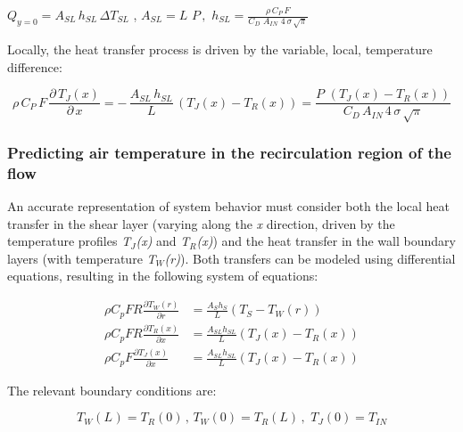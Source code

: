 {\({Q_{y = 0}} = {A_{SL}}\,{h_{SL}}\,\Delta {T_{SL}}\) , \({A_{SL}} = L\,\,P\,,\,\,{h_{SL}} = \frac{{\rho \,{C_P}\,F}}{{{C_D}\,\,{A_{IN}}\,\,4\,\sigma \,\sqrt \pi }}\)

Locally, the heat transfer process is driven by the variable, local, temperature difference:

\begin{equation}
\rho \,{C_P}\,F\,\frac{{\partial \,{T_J}(x)}}{{\partial \,x}} =  - \,\frac{{{A_{SL}}\,{h_{SL}}}}{L}\,\left( {{T_J}(x) - {T_R}(x)} \right) = \frac{{P\,\,\left( {{T_J}(x) - {T_R}(x)} \right)}}{{{C_D}\,{A_{IN}}\,4\,\sigma \,\sqrt \pi  }}
\end{equation}

\subsubsection{Predicting air temperature in the recirculation region of the flow}\label{predicting-air-temperature-in-the-recirculation-region-of-the-flow}

An accurate representation of system behavior must consider both the local heat transfer in the shear layer (varying along the \emph{x} direction, driven by the temperature profiles \emph{T\(_{J}\)(x)} and \emph{T\(_{R}\)(x)}) and the heat transfer in the wall boundary layers (with temperature \emph{T\(_{W}\)(r)}). Both transfers can be modeled using differential equations, resulting in the following system of equations:

\begin{equation}
  \begin{array}{rl}
    \rho C_p F R \frac{\partial T_W \left(r\right)}{\partial r} & = \frac{A_S h_S}{L} \left(T_S - T_W \left(r\right)\right) \\
    \rho C_p F R \frac{\partial T_R \left(x\right)}{\partial x} & = \frac{A_{SL} h_{SL}}{L} \left(T_J\left(x\right) - T_R \left(x\right)\right) \\
    \rho C_p F \frac{\partial T_J \left(x\right)}{\partial x} & = \frac{A_{SL} h_{SL}}{L} \left(T_J\left(x\right) - T_R \left(x\right)\right) 
  \end{array}
\end{equation}

The relevant boundary conditions are:

\begin{equation}
{T_W}({L_{}}) = {T_R}(0)\,,\,{T_W}(0) = {T_R}(L)\,,\,\,{T_J}(0) = {T_{IN}}
\end{equation}

}
